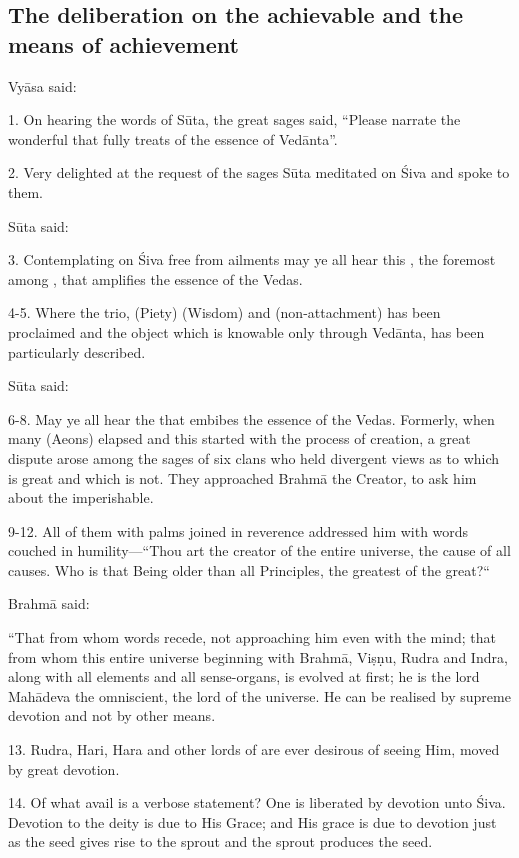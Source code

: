 \subsection{The deliberation on the achievable and the means of achievement}

Vyāsa said:

1. On hearing the words of Sūta, the great sages said, “Please narrate
the wonderful  that fully treats of the essence of Vedānta”.

2. Very delighted at the request of the sages Sūta meditated on Śiva and spoke
to them.

Sūta said:

3. Contemplating on Śiva free from ailments may ye all hear this ,
the foremost among , that amplifies the essence of the Vedas.

4-5. Where the trio,  (Piety)  (Wisdom) and 
(non-attachment) has been proclaimed and the object which is knowable only
through Vedānta, has been particularly described.

Sūta said:

6-8. May ye all hear the  that embibes the essence of the Vedas.
Formerly, when many  (Aeons) elapsed and this  started with
the process of creation, a great dispute arose among the sages of six clans who
held divergent views as to which is great and which is not. They approached
Brahmā the Creator, to ask him about the imperishable.

9-12. All of them with palms joined in reverence addressed him with words
couched in humility—“Thou art the creator of the entire universe, the cause of
all causes. Who is that Being older than all Principles, the greatest of
the great?“

Brahmā said:

“That from whom words recede, not approaching him even with the mind; that from
whom this entire universe beginning with Brahmā, Viṣṇu, Rudra and Indra, along
with all elements and all sense-organs, is evolved at first; he is the lord
Mahādeva the omniscient, the lord of the universe. He can be realised by supreme
devotion and not by other means.

13. Rudra, Hari, Hara and other lords of  are ever desirous of seeing
Him, moved by great devotion.

14. Of what avail is a verbose statement? One is liberated by devotion unto Śiva.
Devotion to the deity is due to His Grace; and His grace is due to devotion just
as the seed gives rise to the sprout and the sprout produces the seed.

